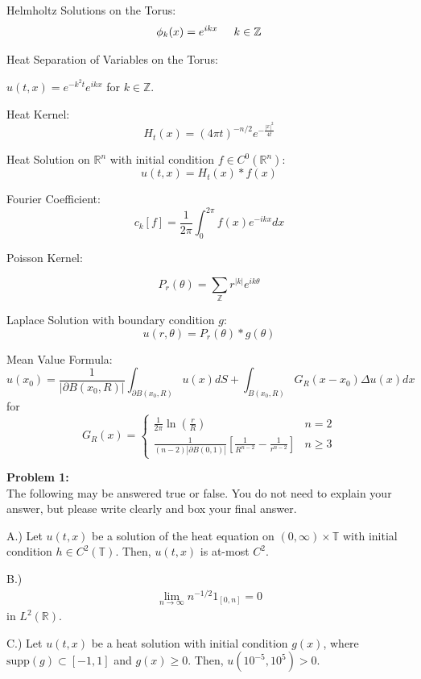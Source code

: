 \documentclass{article}
\newcommand{\Z}{{\mathbb{Z}}}
\newcommand{\R}{{\mathbb{R}}}
\newcommand{\pd}{\partial}
\begin{document}
Helmholtz Solutions on the Torus: $$\phi_{k}(x) = e^{ikx} \hspace{0.5 cm} k \in \Z$$

Heat Separation of Variables on the Torus: 

$u(t,x) = e^{-k^{2}t}e^{ikx}$ for $k \in \Z$. 


Heat Kernel:$$ H_{t}(x) = (4\pi t)^{-n/2} e^{-\frac{|x|^{2}}{4t}} $$

Heat Solution on $\R^{n}$ with initial condition $f \in C^{0}(\R^{n})$: $$u(t,x) = H_{t}(x) * f(x)$$

Fourier Coefficient: $$c_{k}[f] = \frac{1}{2\pi}\int_{0}^{2\pi} f(x) e^{-ikx} dx$$

Poisson Kernel: 

$$P_{r}(\theta) = \sum_{\Z} r^{|k|}e^{ik\theta}$$

Laplace Solution with boundary condition $g$:
$$u(r,\theta) = P_{r}(\theta)*g(\theta)$$

Mean Value Formula:
$$ u(x_0) = \frac{1}{|\pd B(x_0,R)|} \int_{\pd B(x_0,R)} u(x)dS + \int_{B(x_0,R)} G_{R}(x-x_0) \Delta u(x)dx$$
for 
$$ G_{R}(x) = \begin{cases} \frac{1}{2\pi} \ln(\frac{r}{R})& n=2 \\ \frac{1}{(n-2)|\pd B(0,1)|} \left[ \frac{1}{R^{n-2}} - \frac{1}{r^{n-2}}\right] & n \geq 3\end{cases}$$








\newpage


\textbf{Problem 1:} \\

The following may be answered true or false. You do not need to explain your answer, but please write clearly and box your final answer. 



\vspace{1 cm}
A.) Let $u(t,x)$ be a solution of the heat equation on $(0,\infty) \times \mathbb{T}$ with initial condition $h \in C^{2}(\mathbb{T})$. Then, $u(t,x)$ is at-most $C^{2}$. 


\vspace{3 cm}
B.) 
\begin{align*}
	\lim_{n \to \infty} n^{-1/2}1_{[0,n]} = 0
\end{align*}
in $L^{2}(\R)$. 

\vspace{3 cm}
C.) Let $u(t,x)$ be a heat solution with initial condition $g(x)$, where $\text{supp}(g) \subset [-1,1]$ and $g( x) \geq 0$. Then, $u(10^{-5},10^{5}) > 0$. 
\end{document}
